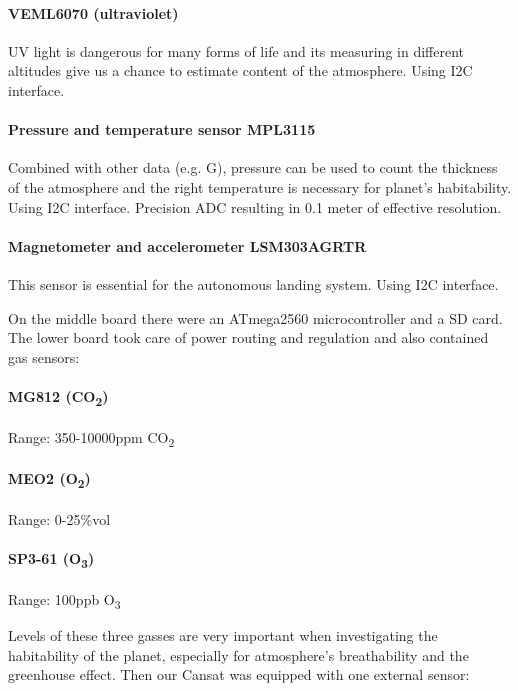 \documentclass{cfp}
\begin{document}
\paragraph{VEML6070 (ultraviolet)}UV light is dangerous for many forms of life and its measuring in different altitudes give us a chance to estimate content of the atmosphere. Using I2C interface.
\paragraph{Pressure and temperature sensor MPL3115}Combined with other data (e.g. G), pressure can be used to count the thickness of the atmosphere and the right temperature is necessary for planet’s habitability. Using I2C interface. Precision ADC resulting in 0.1 meter of effective resolution.
\paragraph{Magnetometer and accelerometer LSM303AGRTR}This sensor is essential for the autonomous landing system. Using I2C interface.
\par On the middle board there were an ATmega2560 microcontroller and a SD card. The lower board took care of power routing and regulation and also contained gas sensors:
\paragraph{MG812 (CO\textsubscript{2})}Range: 350-10000ppm CO\textsubscript{2}
\paragraph{MEO2 (O\textsubscript{2})}Range: 0-25\%vol
\paragraph{SP3-61 (O\textsubscript{3})}Range: 100ppb O\textsubscript{3}
\par Levels of these three gasses are very important when investigating the habitability of the planet, especially for atmosphere’s breathability and the greenhouse effect. Then our Cansat was equipped  with one external sensor:
\end{document}
